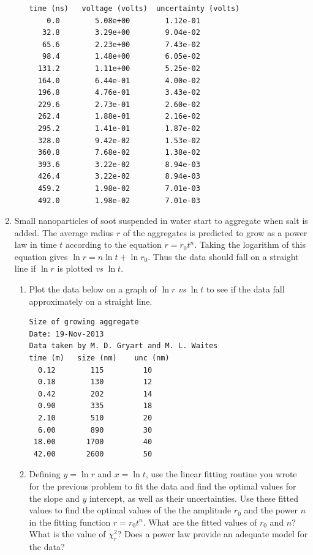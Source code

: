 \documentclass[letterpaper,10pt,english]{sphinxmanual}
\begin{document}
\begin{enumerate}
\begin{enumerate}
\begin{Verbatim}[commandchars=\\\{\}]
time (ns)   voltage (volts)  uncertainty (volts)
    0.0        5.08e+00        1.12e-01
   32.8        3.29e+00        9.04e-02
   65.6        2.23e+00        7.43e-02
   98.4        1.48e+00        6.05e-02
  131.2        1.11e+00        5.25e-02
  164.0        6.44e-01        4.00e-02
  196.8        4.76e-01        3.43e-02
  229.6        2.73e-01        2.60e-02
  262.4        1.88e-01        2.16e-02
  295.2        1.41e-01        1.87e-02
  328.0        9.42e-02        1.53e-02
  360.8        7.68e-02        1.38e-02
  393.6        3.22e-02        8.94e-03
  426.4        3.22e-02        8.94e-03
  459.2        1.98e-02        7.01e-03
  492.0        1.98e-02        7.01e-03
\end{Verbatim}

\end{enumerate}

\item {} 
Small nanoparticles of soot suspended in water start to aggregate when salt is added.  The average radius $r$ of the aggregates is predicted to grow as a power law in time $t$ according to the equation $r = r_0t^n$.  Taking the logarithm of this equation gives $\ln r = n\ln t + \ln r_0$.  Thus the data should fall on a straight line if $\ln r$ is plotted \emph{vs} $\ln t$.
\begin{enumerate}
\item {} 
Plot the data below on a graph of $\ln r$ \emph{vs} $\ln t$ to see if the data fall approximately on a straight line.

\begin{Verbatim}[commandchars=\\\{\}]
Size of growing aggregate
Date: 19-Nov-2013
Data taken by M. D. Gryart and M. L. Waites
time (m)   size (nm)    unc (nm)
  0.12        115         10
  0.18        130         12
  0.42        202         14
  0.90        335         18
  2.10        510         20
  6.00        890         30
 18.00       1700         40
 42.00       2600         50
\end{Verbatim}

\item {} 
Defining $y = \ln r$ and $x = \ln t$, use the linear fitting routine you wrote for the previous problem to fit the data and find the optimal values for the slope and $y$ intercept, as well as their uncertainties.  Use these fitted values to find the optimal values of the the amplitude $r_0$ and the power $n$ in the fitting function $r = r_0t^n$.  What are the fitted values of $r_0$ and $n$?  What is the value of $\chi_r^2$?  Does a power law provide an adequate model for the data?


\end{enumerate}
\end{enumerate}
\end{document}
